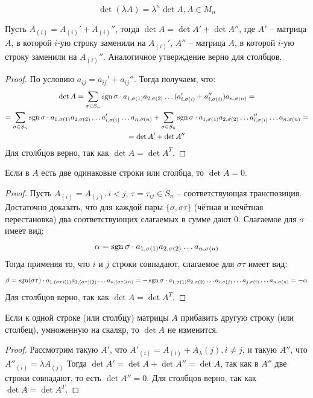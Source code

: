 \documentclass[12pt]{article}
\begin{document}
\begin{consequence}
	\[\det(\lambda A)=\lambda^n\det A, A\in M_n\]
\end{consequence}
\begin{statement}
	Пусть $A_{(i)}=A_{(i)}'+A_{(i)}''$, тогда $\det A=\det A'+\det A''$,
	где $A'$ -- матрица $A$, в которой $i$-ую строку заменили на
	$A_{(i)}'$, $A''$ -- матрица $A$, в которой $i$-ую строку заменили
	на $A_{(i)}''$. Аналогичное утверждение верно для столбцов.
	\begin{proof}
		По условию $a_{ij}=a_{ij}'+a_{ij}''$. Тогда получаем, что:
		\begin{multline*}
			\det A=\sum_{\sigma\in S_n}\operatorname{sgn} \sigma\cdot
			a_{1,\sigma(1)}a_{2,\sigma(2)}\ldots(a_{i,\sigma(i)}'+a_{i,\sigma(i)}'')
			a_{n,\sigma(n)}=\\
			=\sum_{\sigma\in S_n}\operatorname{sgn} \sigma\cdot
			a_{1,\sigma(1)}a_{2,\sigma(2)}\ldots a_{i,\sigma(i)}'\ldots
			a_{n,\sigma(n)}+\sum_{\sigma\in S_n}\operatorname{sgn} \sigma\cdot
			a_{1,\sigma(1)}a_{2,\sigma(2)}\ldots a_{i,\sigma(i)}''\ldots
			a_{n,\sigma(n)}=\\
			=\det A' + \det A''
		\end{multline*}
		Для столбцов верно, так как $\det A=\det A^T$.
	\end{proof}
\end{statement}
\begin{statement}
	Если в $A$ есть две одинаковые строки или столбца, то $\det A=0$.
	\begin{proof}
		Пусть $A_{(i)}=A_{(j)}, i<j$, $\tau=\tau_{ij}\in S_n$ --
		соответствующая транспозиция. Достаточно доказать, что для каждой
		пары $\{\sigma, \sigma\tau\}$ (чётная и нечётная перестановка) два
		соответствующих слагаемых в сумме дают 0. Слагаемое для $\sigma$ имеет вид:
		\[\alpha=\operatorname{sgn} \sigma\cdot a_{1,\sigma(1)}a_{2,\sigma(2)}\ldots
		a_{n,\sigma(n)}\]		Тогда применяя то, что $i$ и $j$ строки
		совпадают, слагаемое для
		$\sigma\tau$ имеет вид:
		\[\beta=\operatorname{sgn} (\sigma\tau)\cdot
			a_{1,(\sigma\tau)(1)}a_{2,(\sigma\tau)(2)}\ldots
			a_{n,(\sigma\tau)(n)}=-\operatorname{sgn}\sigma\cdot
			a_{1,\sigma(1)}a_{2,\sigma(2)}\ldots a_{i, \sigma(j)}\ldots
		a_{j,\sigma(i)}\ldots a_{n,\sigma(n)}=-\alpha\]		Для столбцов
		верно, так как $\det A=\det A^T$.
	\end{proof}
\end{statement}
\begin{statement}
	Если к одной строке (или столбцу) матрицы $A$ прибавить другую
	строку (или столбец), умноженную на скаляр, то $\det A$ не изменится.
	\begin{proof}
		Рассмотрим такую $A'$, что $A'_{(i)}=A_{(i)}+A_\lambda{(j)}, i\neq
		j$, и такую $A''$, что $A''_{(i)}=\lambda A_{(j)}$ Тогда $\det
		A'=\det A + \det A''=\det A$, так как в $A''$ две строки совпадают,
		то есть $\det A''=0$. Для столбцов верно, так как $\det A=\det A^T$.
	\end{proof}
\end{statement}
\end{document}
